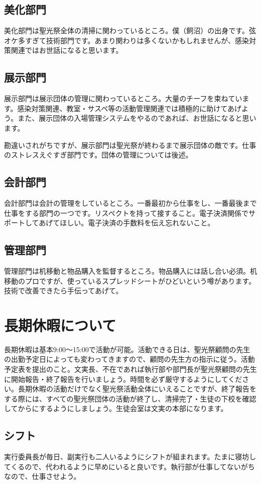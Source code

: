\documentclass[a4paper]{ltjsreport}
\begin{document}
\subsection{美化部門}
美化部門は聖光祭全体の清掃に関わっているところ。僕（飼沼）の出身です。弦オケ多すぎて技術部門です。あまり関わりは多くないかもしれませんが、感染対策関連ではお世話になると思います。

\subsection{展示部門}
展示部門は展示団体の管理に関わっているところ。大量のチーフを束ねています。感染対策関連、教室・サスペ等の活動管理関連では積極的に助けてあげよう。また、展示団体の入場管理システムをやるのであれば、お世話になると思います。

勘違いされがちですが、展示部門は聖光祭が終わるまで展示団体の敵です。仕事のストレスえぐすぎ部門です。団体の管理については後述。

\subsection{会計部門}
会計部門は会計の管理をしているところ。一番最初から仕事をし、一番最後まで仕事をする部門の一つです。リスペクトを持って接すること。電子決済関係でサポートしてあげてほしい。電子決済の手数料を伝え忘れないこと。

\subsection{管理部門}
管理部門は机移動と物品購入を監督するところ。物品購入には話し合い必須。机移動のプロですが、使っているスプレッドシートがひどいという噂があります。技術で改善できたら手伝ってあげて。

\section{長期休暇について}
長期休暇は基本9:00～15:00で活動が可能。活動できる日は、聖光祭顧問の先生の出勤予定日によっても変わってきますので、顧問の先生方の指示に従う。活動予定表を提出のこと。文実長、不在であれば執行部や部門長が聖光祭顧問の先生に開始報告・終了報告を行いましょう。時間を必ず厳守するようにしてください。長期休暇の活動だけでなく聖光祭活動全体にいえることですが、終了報告をする際には、すべての聖光祭団体の活動が終了し、清掃完了・生徒の下校を確認してからにするようにしましょう。生徒会室は文実の本部になります。

\subsection{シフト}
実行委員長が毎日、副実行も二人いるようにシフトが組まれます。たまに寝坊してくるので、代われるように早めにいると良いです。執行部が仕事してないがちなので、仕事させよう。
\end{document}
